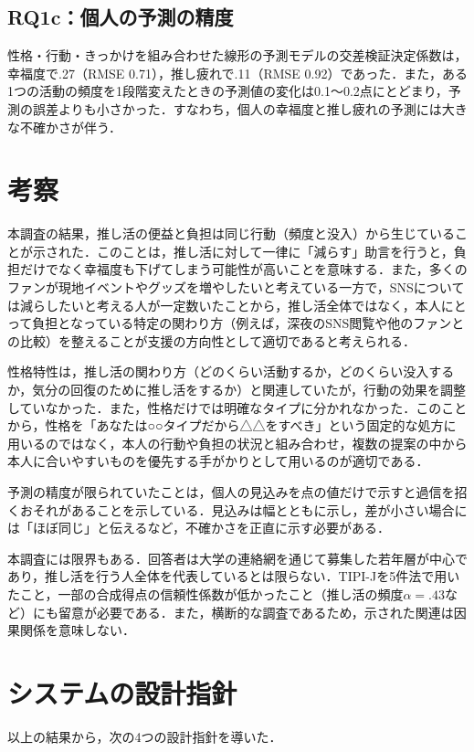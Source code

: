\subsection{RQ1c：個人の予測の精度}
性格・行動・きっかけを組み合わせた線形の予測モデルの交差検証決定係数は，幸福度で.27（RMSE 0.71），推し疲れで.11（RMSE 0.92）であった．また，ある1つの活動の頻度を1段階変えたときの予測値の変化は0.1〜0.2点にとどまり，予測の誤差よりも小さかった．すなわち，個人の幸福度と推し疲れの予測には大きな不確かさが伴う．

\section{考察}
本調査の結果，推し活の便益と負担は同じ行動（頻度と没入）から生じていることが示された．このことは，推し活に対して一律に「減らす」助言を行うと，負担だけでなく幸福度も下げてしまう可能性が高いことを意味する．また，多くのファンが現地イベントやグッズを増やしたいと考えている一方で，SNSについては減らしたいと考える人が一定数いたことから，推し活全体ではなく，本人にとって負担となっている特定の関わり方（例えば，深夜のSNS閲覧や他のファンとの比較）を整えることが支援の方向性として適切であると考えられる．

性格特性は，推し活の関わり方（どのくらい活動するか，どのくらい没入するか，気分の回復のために推し活をするか）と関連していたが，行動の効果を調整していなかった．また，性格だけでは明確なタイプに分かれなかった．このことから，性格を「あなたは○○タイプだから△△をすべき」という固定的な処方に用いるのではなく，本人の行動や負担の状況と組み合わせ，複数の提案の中から本人に合いやすいものを優先する手がかりとして用いるのが適切である．

予測の精度が限られていたことは，個人の見込みを点の値だけで示すと過信を招くおそれがあることを示している．見込みは幅とともに示し，差が小さい場合には「ほぼ同じ」と伝えるなど，不確かさを正直に示す必要がある．

本調査には限界もある．回答者は大学の連絡網を通じて募集した若年層が中心であり，推し活を行う人全体を代表しているとは限らない．TIPI-Jを5件法で用いたこと，一部の合成得点の信頼性係数が低かったこと（推し活の頻度$\alpha=.43$など）にも留意が必要である．また，横断的な調査であるため，示された関連は因果関係を意味しない．

\section{システムの設計指針}
以上の結果から，次の4つの設計指針を導いた．

